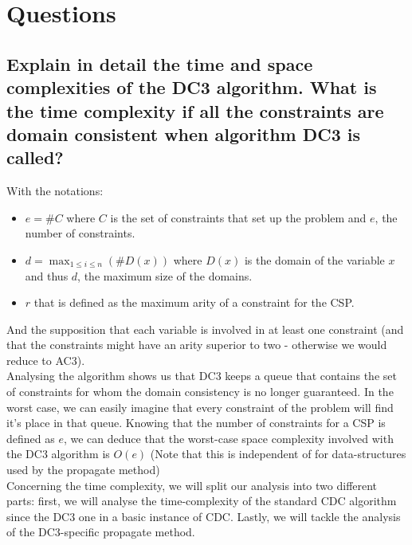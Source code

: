 \documentclass[a4paper ,12pt,french]{article}
\begin{document}
\tableofcontents %

\thispagestyle{fancy}

\pagebreak
\setcounter{page}{1}
\pagestyle{fancy} %

\section{Questions}
\subsection{Explain in detail the time and space complexities of the DC3 algorithm. What is the time complexity if all the constraints are domain consistent when algorithm DC3 is called?}
With the notations: \begin{itemize}
\item $e = \#C$ where $C$ is the set of constraints that set up the problem and $e$, the number of constraints.
\item $d = \max_{1\leq i \leq n}(\#D(x))$ where $D(x)$ is the domain of the variable $x$ and thus $d$, the maximum size of the domains. 
\item $r$ that is defined as the maximum arity of a constraint for the CSP.
\end{itemize}
And the supposition that each variable is involved in at least one constraint (and that the constraints might have an arity superior to two - otherwise we would reduce to AC3).\\

Analysing the algorithm shows us that DC3 keeps a queue that contains the set of constraints for whom the domain consistency is no longer guaranteed. In the worst case, we can easily imagine that every constraint of the problem will find it's place in that queue. Knowing that the number of constraints for a CSP is defined as $e$, we can deduce that the worst-case space complexity involved with the DC3 algorithm is $O(e)$ (Note that this is independent of for data-structures used by the propagate method)\\

Concerning the time complexity, we will split our analysis into two different parts: first, we will analyse the time-complexity of the standard CDC algorithm since the DC3 one in a basic instance of CDC. Lastly, we will tackle the analysis of the DC3-specific propagate method.
\end{document}
